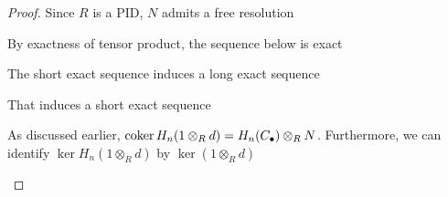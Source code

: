 \documentclass{report}
\begin{document}
\begin{proof}
    Since $R$ is a PID, $N$ admits a free resolution
    \begin{center}
    \end{center}

    By exactness of tensor product, the sequence below is exact

    \begin{center}
    \end{center}

    The short exact sequence induces a long exact sequence

    \begin{center}
    \end{center}

    That induces a short exact sequence

    \begin{center}
    \end{center}

    As discussed earlier, $\operatorname{coker} H_n(1 \otimes_R d) = H_n(C_\bullet) \otimes_R N$. Furthermore, we can identify $\ker H_n(1 \otimes_R d)$ by $\ker (1 \otimes_R d)$
    \begin{center}
    \end{center}


\end{proof}
\end{document}
